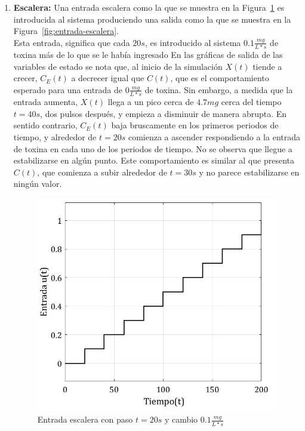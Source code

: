 \begin{enumerate}
\item \textbf{Escalera:} Una entrada escalera como la que se muestra en la Figura~\ref{fig:entrada-escalera1} es introducida al sistema produciendo una salida como la que se muestra en la Figura~\ref{fig:entrada-escalera}. \\
Esta entrada, significa que cada $20s$, es introducido al sistema $0.1\frac{mg}{L*s}$ de toxina más de lo que se le había ingresado
En las gráficas de salida de las variables de estado se nota que, al inicio de la simulación $X(t)$ tiende a crecer, $C_E(t)$ a decrecer igual que $C(t)$, que es el comportamiento esperado para una entrada de $0\frac{mg}{L*s}$ de toxina. Sin embargo, a medida que la entrada aumenta, $X(t)$ llega a un pico cerca de $4.7mg$ cerca del tiempo $t = 40s$, dos pulsos después, y empieza a disminuir de manera abrupta. En sentido contrario, $C_E(t)$ baja bruscamente en los primeros periodos de tiempo, y alrededor de $t = 20s$ comienza a ascender respondiendo a la entrada de toxina en cada uno de los periodos de tiempo. No se observa que llegue a estabilizarse en algún punto. Este comportamiento es similar al que presenta $C(t)$, que comienza a subir alrededor de $t = 30s$ y no parece estabilizarse en ningún valor.

\begin{figure}[th!]
\centering
\includegraphics[scale = 0.4]{entrada-escalera1}
\caption{Entrada escalera con paso $t = 20s$ y cambio $0.1\frac{mg}{L*s}$}
\label{fig:entrada-escalera1}
\end{figure}


\end{enumerate}
